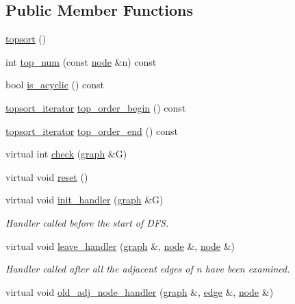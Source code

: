 \subsection*{Public Member Functions}
\begin{DoxyCompactItemize}
\item 
\mbox{\hyperlink{classtopsort_a76a9055969b9dbf006320040be9fd5e6}{topsort}} ()
\item 
int \mbox{\hyperlink{classtopsort_a0f0b52c54ffa4d1056ef96f16489f30f}{top\+\_\+num}} (const \mbox{\hyperlink{classnode}{node}} \&n) const
\item 
bool \mbox{\hyperlink{classtopsort_a05a4cb00bbd60859f4939355b23c25f1}{is\+\_\+acyclic}} () const
\item 
\mbox{\hyperlink{classtopsort_a04a42f813522640e17dddbaeb55498e4}{topsort\+\_\+iterator}} \mbox{\hyperlink{classtopsort_ab220dcce845e001b0f737d0dc7751abc}{top\+\_\+order\+\_\+begin}} () const
\item 
\mbox{\hyperlink{classtopsort_a04a42f813522640e17dddbaeb55498e4}{topsort\+\_\+iterator}} \mbox{\hyperlink{classtopsort_ac9b784654ae0c4e9736931d63d03291b}{top\+\_\+order\+\_\+end}} () const
\item 
virtual int \mbox{\hyperlink{classtopsort_a777a9a68c4081d22e7b698ed3c515343}{check}} (\mbox{\hyperlink{classgraph}{graph}} \&G)
\item 
virtual void \mbox{\hyperlink{classtopsort_aa3d9ccc7c632dac6b7303e9828c14f62}{reset}} ()
\item 
virtual void \mbox{\hyperlink{classtopsort_a21aaf28fc280094ed43288e58d8e3ae1}{init\+\_\+handler}} (\mbox{\hyperlink{classgraph}{graph}} \&G)
\begin{DoxyCompactList}\small\item\em Handler called before the start of D\+FS. \end{DoxyCompactList}\item 
virtual void \mbox{\hyperlink{classtopsort_afd27bb676fd3987456bf71d83c05acb8}{leave\+\_\+handler}} (\mbox{\hyperlink{classgraph}{graph}} \&, \mbox{\hyperlink{classnode}{node}} \&, \mbox{\hyperlink{classnode}{node}} \&)
\begin{DoxyCompactList}\small\item\em Handler called after all the adjacent edges of {\itshape n} have been examined. \end{DoxyCompactList}\item 
virtual void \mbox{\hyperlink{classtopsort_ab42587b5a1e776be5106502dfeb6b0b1}{old\+\_\+adj\+\_\+node\+\_\+handler}} (\mbox{\hyperlink{classgraph}{graph}} \&, \mbox{\hyperlink{classedge}{edge}} \&, \mbox{\hyperlink{classnode}{node}} \&)

\end{DoxyCompactItemize}
